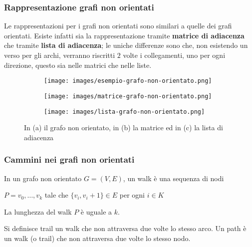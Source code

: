 \subsubsection{Rappresentazione grafi non orientati}
Le rappresentazioni per i grafi non orientati sono similari a quelle dei grafi orientati. Esiste infatti sia la rappresentazione tramite \textbf{matrice di adiacenza} che tramite \textbf{lista di adiacenza}; le uniche differenze sono che, non esistendo un verso per gli archi, verranno riscritti $2$ volte i collegamenti, uno per ogni direzione, questo sia nelle matrici che nelle liste.
\begin{figure}[h!]
    \centering
    \begin{subfigure}{.3\textwidth}
        \centering
        \texttt{[image: images/esempio-grafo-non-orientato.png]}
        \caption{}
    \end{subfigure}
    \hfill
    \begin{subfigure}{.3\textwidth}
        \centering
        \texttt{[image: images/matrice-grafo-non-orientato.png]}
        \caption{}
    \end{subfigure}
    \hfill
    \begin{subfigure}{.3\textwidth}
        \centering
        \texttt{[image: images/lista-grafo-non-orientato.png]}
        \caption{}
    \end{subfigure}
    \vspace{-5pt}
    \caption{In (a) il grafo non orientato, in (b) la matrice ed in (c) la lista di adiacenza}
\end{figure}

\subsubsection{Cammini nei grafi non orientati}
\begin{definition}[Walk]
    In un grafo non orientato $G = (V,E)$, un walk è una sequenza di nodi
    \begin{center}
        $P = v_0, \ldots, v_k$ tale che $\{v_i, v_i+1\} \in E$ per ogni $i \in K$
    \end{center}
    La lunghezza del walk $P$ è uguale a $k$.
\end{definition}

\begin{definition}
    Si definisce trail un walk che non attraversa due volte lo stesso arco. Un path è un walk (o trail) che non attraversa due volte lo stesso nodo.
\end{definition}

